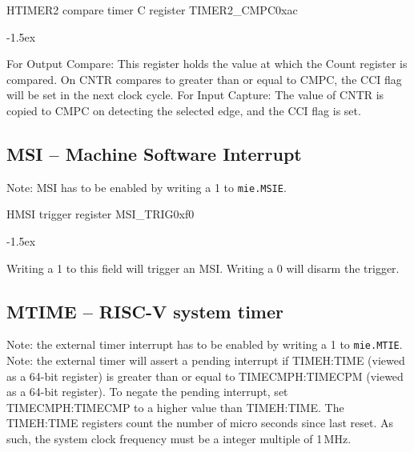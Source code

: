 \documentclass[12pt]{article}
\begin{document}
\begin{register}{H}{TIMER2 compare timer C register TIMER2\_CMPC}{0xac}
\label{timer2cmpc}
%
\regnewline%
\end{register}
\begin{regdesc}[0.8\textwidth]\begin{reglist}[00000]
\itemsep-1.5ex
\item[CMPC] For Output Compare: This register holds the value at which the Count register is compared. On CNTR compares to greater than or equal to CMPC, the CCI flag will be set in the next clock cycle. For Input Capture: The value of CNTR is copied to CMPC on detecting the selected edge, and the CCI flag is set.
\end{reglist}\end{regdesc}


\subsection{MSI -- Machine Software Interrupt}
Note: MSI has to be enabled by writing a 1 to \lstinline[breaklines=false]|mie.MSIE|.

\begin{register}{H}{MSI trigger register MSI\_TRIG}{0xf0}
\label{msitrig}
%
%
\regnewline%
\end{register}
\begin{regdesc}[0.8\textwidth]\begin{reglist}[00000]
\itemsep-1.5ex
\item [TRIG] Writing a 1 to this field will trigger an MSI. Writing a 0 will disarm the trigger.
\end{reglist}\end{regdesc}

\subsection{MTIME -- RISC-V system timer}
Note: the external timer interrupt has to be enabled by writing a 1 to \lstinline[breaklines=false]|mie.MTIE|.
Note: the external timer will assert a pending interrupt if TIMEH:TIME (viewed as a 64-bit register) is greater than or equal to TIMECMPH:TIMECPM (viewed as a 64-bit register). To negate the pending interrupt, set TIMECMPH:TIMECMP to a higher value than TIMEH:TIME. The TIMEH:TIME registers count the number of micro seconds since last reset. As such, the system clock frequency must be a integer multiple of 1\,MHz.
\end{document}
